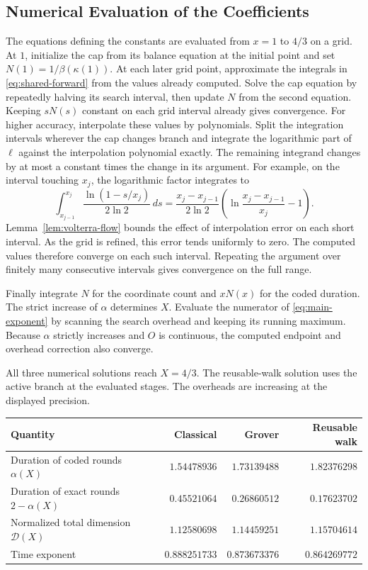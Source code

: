 \documentclass[runningheads,envcountsame,envcountsect,orivec]{llncs}
\begin{document}
\subsection{Numerical Evaluation of the Coefficients}
\label{app:evaluation}

The equations defining the constants are evaluated from
$x=1$ to $4/3$ on a grid. At $1$, initialize the cap from its
balance equation at the initial point and set $N(1)=1/\beta(\kappa(1))$.
At each later grid point, approximate the integrals in
\eqref{eq:shared-forward} from the values already computed.
Solve the cap equation by repeatedly halving its search
interval, then update $N$ from the second equation. Keeping $sN(s)$ constant on each grid interval
already gives convergence. For higher accuracy, interpolate
these values by polynomials. Split the integration intervals
wherever the cap changes branch and integrate the logarithmic
part of $\ell$ against the interpolation polynomial exactly.
The remaining integrand changes by at most a constant times
the change in its argument. For example, on the interval touching
$x_j$, the logarithmic factor integrates to
\[
 \int_{x_{j-1}}^{x_j}\frac{\ln(1-s/x_j)}{2\ln 2}\,ds
 =\frac{x_j-x_{j-1}}{2\ln 2}
   \left(\ln\frac{x_j-x_{j-1}}{x_j}-1\right).
\]
Lemma~\ref{lem:volterra-flow} bounds the effect of interpolation
error on each short interval. As the grid is refined, this error
tends uniformly to zero. The computed values therefore converge
on each such interval. Repeating the argument over finitely
many consecutive intervals gives convergence on the full range.

Finally integrate $N$ for the coordinate count and $xN(x)$
for the coded duration. The strict increase of $\alpha$
determines $X$. Evaluate the numerator of \eqref{eq:main-exponent}
by scanning the search overhead and keeping its running
maximum. Because $\alpha$ strictly increases and $O$ is continuous,
the computed endpoint and overhead correction also converge.

All three numerical solutions reach $X=4/3$. The reusable-walk
solution uses the active branch at the evaluated stages. The
overheads are increasing at the displayed precision.

\begin{center}
\small
\begin{tabularx}{\linewidth}{@{}Xrrr@{}}
\toprule
Quantity & Classical & Grover & Reusable walk\\
\midrule
Duration of coded rounds $\alpha(X)$ & $1.54478936$ & $1.73139488$ & $1.82376298$\\
Duration of exact rounds $2-\alpha(X)$ & $0.45521064$ & $0.26860512$ & $0.17623702$\\
Normalized total dimension $\mathcal D(X)$ & $1.12580698$ & $1.14459251$ & $1.15704614$\\
Time exponent & $0.888251733$ & $0.873673376$ & $0.864269772$\\
\bottomrule
\end{tabularx}
\end{center}
\end{document}
